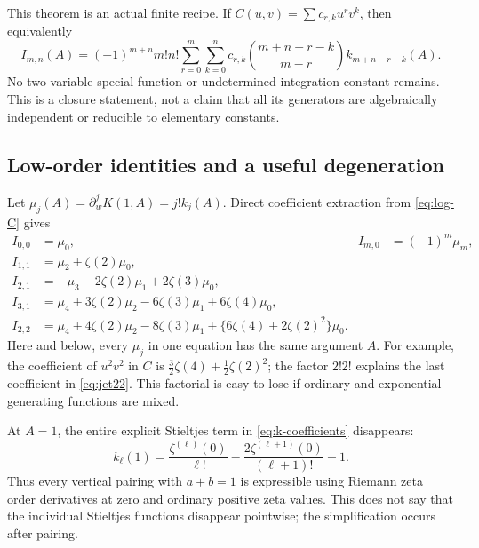 This theorem is an actual finite recipe. If
$C(u,v)=\sum c_{r,k}u^rv^k$, then equivalently
\begin{equation}\label{eq:finite-jet-recipe}
 I_{m,n}(A)=(-1)^{m+n}m!n!
  \sum_{r=0}^m\sum_{k=0}^n c_{r,k}
       \binom{m+n-r-k}{m-r}k_{m+n-r-k}(A).
\end{equation}
No two-variable special function or undetermined integration constant
remains. This is a closure statement, not a claim that all its generators
are algebraically independent or reducible to elementary constants.

\subsection{Low-order identities and a useful degeneration}
Let $\mu_j(A)=\partial_w^jK(1,A)=j!k_j(A)$. Direct coefficient extraction
from \eqref{eq:log-C} gives
\begin{align}
 I_{0,0}&=\mu_0,&
 I_{m,0}&=(-1)^m\mu_m,\label{eq:jet-row0}\\
 I_{1,1}&=\mu_2+\zeta(2)\mu_0,\label{eq:jet11}\\
 I_{2,1}&=-\mu_3-2\zeta(2)\mu_1+2\zeta(3)\mu_0,\label{eq:jet21}\\
 I_{3,1}&=\mu_4+3\zeta(2)\mu_2-6\zeta(3)\mu_1
                   +6\zeta(4)\mu_0,\label{eq:jet31}\\
 I_{2,2}&=\mu_4+4\zeta(2)\mu_2-8\zeta(3)\mu_1
                   +\{6\zeta(4)+2\zeta(2)^2\}\mu_0.
                   \label{eq:jet22}
\end{align}
Here and below, every $\mu_j$ in one equation has the same argument $A$.
For example, the coefficient of $u^2v^2$ in $C$ is
$\frac32\zeta(4)+\frac12\zeta(2)^2$; the factor $2!2!$ explains the last
coefficient in \eqref{eq:jet22}. This factorial is easy to lose if ordinary
and exponential generating functions are mixed.

At $A=1$, the entire explicit Stieltjes term in
\eqref{eq:k-coefficients} disappears:
\begin{equation}\label{eq:A-one-degeneration}
 k_\ell(1)=\frac{\zeta^{(\ell)}(0)}{\ell!}
          -\frac{2\zeta^{(\ell+1)}(0)}{(\ell+1)!}-1.
\end{equation}
Thus every vertical pairing with $a+b=1$ is expressible using Riemann zeta
order derivatives at zero and ordinary positive zeta values. This does
not say that the individual Stieltjes functions disappear pointwise;
the simplification occurs after pairing.

